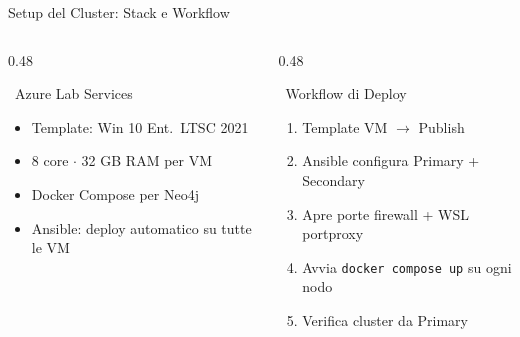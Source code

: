 \documentclass[aspectratio=169]{beamer}
\newcommand{\icoCogs}{\faCogs}
\newcommand{\icoServer}{\faServer}
\newcommand{\icoDocker}{\faDocker}
\newcommand{\icoCloud}{\faCloud}
\newcommand{\icoAnsible}{\faTools}
\newcommand{\icoCogs}{\ding{102}}
\newcommand{\icoServer}{\ding{111}}
\newcommand{\icoDocker}{\ding{117}}
\newcommand{\icoCloud}{\ding{117}}
\newcommand{\icoAnsible}{\ding{46}}
\begin{document}
\begin{frame}{Setup del Cluster: Stack e Workflow}
  \begin{columns}[T]
    \begin{column}{0.48\textwidth}
      \begin{block}{\icoServer\ Azure Lab Services}
        \small
        \begin{itemize}
          \item[\icoCloud] Template: Win 10 Ent.\ LTSC 2021
          \item[\icoCogs] 8 core $\cdot$ 32 GB RAM per VM
          \item[\icoDocker] Docker Compose per Neo4j
          \item[\icoAnsible] Ansible: deploy automatico su tutte le VM
        \end{itemize}
      \end{block}
    \end{column}
    \begin{column}{0.48\textwidth}
      \begin{block}{\icoCogs\ Workflow di Deploy}
        \small
        \begin{enumerate}
          \item Template VM $\to$ Publish
          \item Ansible configura Primary + Secondary
          \item Apre porte firewall + WSL portproxy
          \item Avvia \texttt{docker compose up} su ogni nodo
          \item Verifica cluster da Primary
        \end{enumerate}
      \end{block}
    \end{column}
  \end{columns}
\end{frame}
\end{document}
